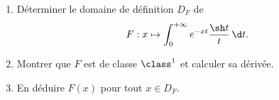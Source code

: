 \begin{enonce}
\begin{exercise}[ID={RMS135 E1480},subtitle={IMT MP 2024},tags={},difficulty={}]

\begin{enumerate}
  \item Déterminer le domaine de définition $D_F$ de
  \begin{equation*}
  F : x \mapsto \int_0^{+\infty} e^{-xt} \frac{\sh t}{t} \, \d t.
  \end{equation*}
  \item Montrer que $F$ est de classe $\class^1$ et calculer sa dérivée.
  \item En déduire $F(x)$ pour tout $x \in D_F$.
\end{enumerate}

\end{exercise}
\begin{solution}
\end{solution}
\end{enonce}
